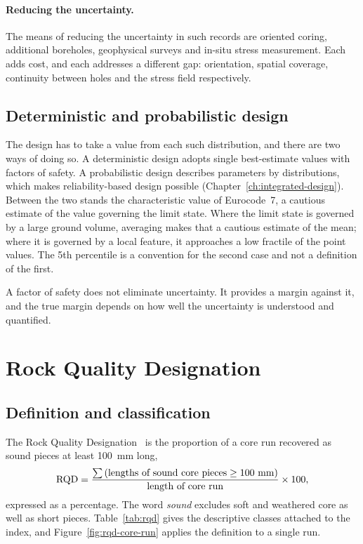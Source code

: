 \paragraph{Reducing the uncertainty.}
The means of reducing the uncertainty in such records are oriented coring,
additional boreholes, geophysical surveys and in-situ stress measurement.
Each adds cost, and each addresses a different gap: orientation, spatial
coverage, continuity between holes and the stress field respectively.

\subsection{Deterministic and probabilistic design}
\label{sec:characteristic-value}

The design has to take a value from each such distribution, and there are two
ways of doing so.
A deterministic design adopts single best-estimate values with factors of
safety. A probabilistic design describes parameters by distributions, which
makes reliability-based design possible (Chapter~\ref{ch:integrated-design}).
Between the two stands the characteristic value of Eurocode~7, a cautious
estimate of the value governing the limit state. Where the limit state is
governed by a large ground volume, averaging makes that a cautious estimate
of the mean; where it is governed by a local feature, it approaches a low
fractile of the point values. The 5th percentile is a convention for the
second case and not a definition of the first.

A factor of safety does not eliminate uncertainty. It provides a margin
against it, and the true margin depends on how well the uncertainty is
understood and quantified.

\section{Rock Quality Designation}
\label{sec:rock-quality-designation}

\subsection{Definition and classification}
\label{sec:rqd-definition}

The Rock Quality Designation~\citep{deere1964technical} is the proportion of
a core run recovered as sound pieces at least 100~mm long,
\[
\mathrm{RQD} = \frac{\sum \text{(lengths of sound core pieces} \geq 100~\text{mm)}}
{\text{length of core run}} \times 100 ,
\]
expressed as a percentage. The word \emph{sound} excludes soft and weathered
core as well as short pieces. Table~\ref{tab:rqd} gives the descriptive
classes attached to the index, and Figure~\ref{fig:rqd-core-run} applies the
definition to a single run.

